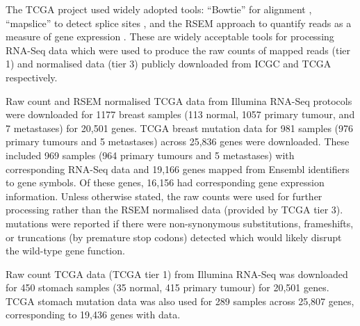 The \gls{TCGA} project \citep{TCGA2012} used widely adopted tools: ``Bowtie''  for alignment \citep{bowtie}, ``mapslice'' to detect splice sites \citep{mapsplice}, and the \gls{RSEM} approach to quantify reads as a measure of \gls{gene expression} \citep{RSEM}. These are widely acceptable tools for processing \gls{RNA-Seq} data which were used to produce the raw counts of mapped reads (tier 1) and normalised  data (tier 3) publicly downloaded from \gls{ICGC} and \gls{TCGA} respectively.

Raw count and \gls{RSEM} normalised \gls{TCGA}  data from Illumina \gls{RNA-Seq} protocols were downloaded for 1177 breast samples (113 normal, 1057 primary tumour, and 7 metastases) for 20,501 genes. \gls{TCGA} breast  \gls{mutation} data for 981 samples (976 primary tumours and 5 metastases) across 25,836 genes were downloaded. These included 969 samples (964 primary tumours and 5 metastases) with corresponding \gls{RNA-Seq}  data and 19,166 genes mapped from Ensembl identifiers to gene symbols. Of these genes, 16,156 had corresponding \gls{gene expression} information. Unless otherwise stated, the raw counts were used for further processing rather than the \gls{RSEM} normalised data (provided by \gls{TCGA} tier 3).  \glspl{mutation} were reported if there were non-synonymous substitutions, frameshifts, or truncations (by premature stop codons) detected which would likely disrupt the \gls{wild-type} gene function.

Raw count \gls{TCGA}  data (\gls{TCGA} tier 1) from Illumina \gls{RNA-Seq} was downloaded for 450 stomach samples (35 normal, 415 primary tumour) for 20,501 genes. \gls{TCGA} stomach \gls{mutation} data was also used for 289 samples across 25,807 genes, corresponding to 19,436 genes with  data.

